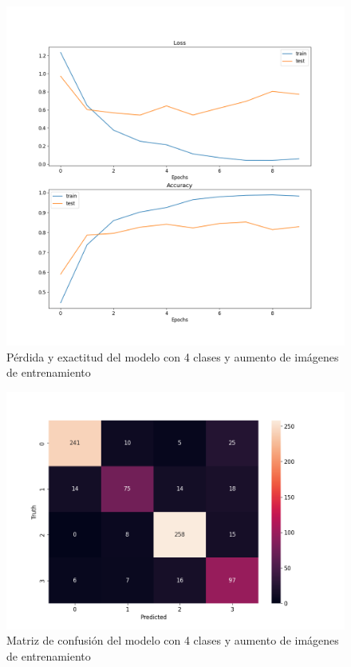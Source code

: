 \begin{figure}[H]
	\centering
	\includegraphics[scale=0.65]{figures/LA6.png}
	\caption{Pérdida y exactitud del modelo con 4 clases y aumento de imágenes de entrenamiento}
	\label{fig:img21}
\end{figure}

\begin{figure}[H]
	\centering
	\includegraphics[scale=0.75]{figures/CM6.png}
	\caption{Matriz de confusión del modelo con 4 clases y aumento de imágenes de entrenamiento}
	\label{fig:img22}
\end{figure}

